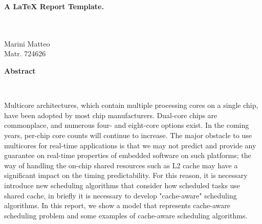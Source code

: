 \documentclass[a4paper,10pt]{article}
\newenvironment*{mytitle}{\begin{LARGE}\bf}{\end{LARGE}\\[1.5ex]}%
\newenvironment*{myabstract}{\begin{Large}\bf}{\end{Large}\\[2.5ex]}%
\begin{document}
\begin{mytitle} A LaTeX Report Template. \end{mytitle}
%
%
\\
Marini Matteo\\
Matr. 724626\\
\hspace{10ex}

\begin{myabstract} Abstract \end{myabstract}

Multicore architectures, which contain multiple processing cores on a single chip, have been adopted by most chip manufacturers.
Dual-core chips are commonplace, and numerous four- and eight-core options exist. In the coming years, per-chip core counts will continue to increase.
The major obstacle to use multicores for real-time applications is that we may not predict and provide any guarantee on real-time properties of embedded software on such platforms; the way of handling the on-chip shared resources such as L2 cache may have a significant impact on the timing
predictability. For this reason, it is necessary introduce new scheduling algorithms that consider how scheduled tasks use shared cache, in briefly it is necessary  to develop "cache-aware" scheduling algorithms. In this report, we show a model that represents cache-aware scheduling problem and some examples of cache-aware scheduling algorithms.
\end{document}
